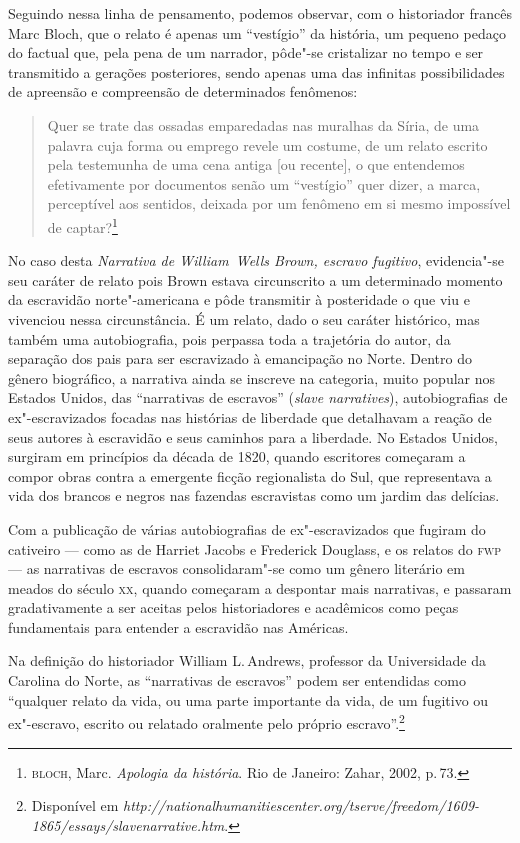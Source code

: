 Seguindo nessa linha de pensamento, podemos observar, com o historiador francês Marc Bloch, que o relato é apenas um ``vestígio'' da história, um pequeno pedaço do factual que, pela pena de um narrador, pôde"-se cristalizar no tempo e ser transmitido a gerações posteriores, sendo apenas uma das infinitas possibilidades de apreensão e compreensão de determinados fenômenos:

\begin{quote}
Quer se trate das ossadas
emparedadas nas muralhas da Síria, de uma palavra cuja forma ou emprego revele um
costume, de um relato escrito pela testemunha de uma cena antiga [ou recente], o que
entendemos efetivamente por documentos senão um ``vestígio'' quer dizer, a marca,
perceptível aos sentidos, deixada por um fenômeno em si mesmo impossível de captar?\footnote{\textsc{bloch}, Marc. \textit{Apologia da história}. Rio de Janeiro: Zahar, 2002, p.\,73.}
\end{quote}

No caso desta \textit{Narrativa de William~Wells Brown, escravo fugitivo}, evidencia"-se seu caráter de relato pois Brown estava circunscrito a um determinado momento da escravidão norte"-americana e pôde transmitir à posteridade o que viu e vivenciou nessa circunstância.
É um relato, dado o seu caráter histórico, mas também uma autobiografia, pois perpassa toda a trajetória do autor, da separação dos pais para ser escravizado à emancipação no Norte.
Dentro do gênero biográfico, a narrativa ainda se inscreve na categoria, muito popular nos Estados Unidos, das ``narrativas de escravos''
(\textit{slave narratives}), autobiografias de ex"-escravizados focadas nas histórias de liberdade que detalhavam a reação de seus autores à escravidão e seus caminhos para a liberdade. No Estados Unidos, surgiram em princípios da década de 1820, quando escritores começaram a compor obras contra a emergente ficção regionalista do Sul, que representava a vida dos brancos e negros nas fazendas escravistas como um jardim das delícias.

Com a publicação de várias autobiografias de ex"-escravizados que fugiram do cativeiro --- como as de Harriet Jacobs e Frederick Douglass, e os relatos do \textsc{fwp} --- as narrativas de escravos consolidaram"-se como um gênero literário em meados do século \textsc{xx}, quando começaram a despontar mais narrativas, e passaram gradativamente a ser aceitas pelos historiadores e acadêmicos como peças fundamentais para entender a escravidão nas Américas.

Na definição do historiador William L.\,Andrews, professor da Universidade da Carolina do Norte, as ``narrativas de escravos'' podem ser entendidas como ``qualquer relato da vida, ou uma parte importante da vida, de um fugitivo ou ex"-escravo, escrito ou relatado oralmente pelo próprio escravo''.\footnote{Disponível em \emph{http://nationalhumanitiescenter.org/tserve/freedom/1609-1865/essays/slavenarrative.htm}.}

